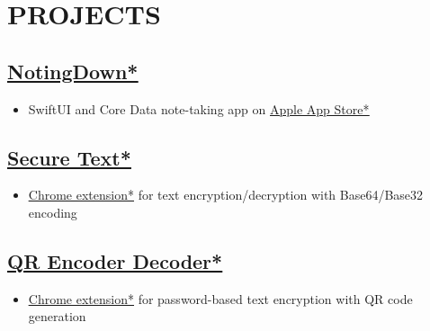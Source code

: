 \documentclass[11pt,a4paper]{moderncv}
\let\oldhref\href
\renewcommand{\href}[2]{\oldhref{#1}{\underline{#2}}}
\begin{document}
\begin{minipage}[t]{0.62\textwidth}
\section{PROJECTS}
\subsection{\href{https://github.com/sachin6174/NotingDown}{NotingDown*}}
\begin{itemize}
    \item SwiftUI and Core Data note-taking app on \href{https://apps.apple.com/us/app/notingdown/id123456789}{Apple App Store*}
\end{itemize}

\subsection{\href{https://github.com/sachin6174/SecureText}{Secure Text*}}
\begin{itemize}
    \item \href{https://chrome.google.com/webstore/detail/secure-text/id123456789}{Chrome extension*} for text encryption/decryption with Base64/Base32 encoding
\end{itemize}

\subsection{\href{https://github.com/sachin6174/QREncoderDecoder}{QR Encoder Decoder*}}
\begin{itemize}
    \item \href{https://chrome.google.com/webstore/detail/qr-encoder-decoder/id123456789}{Chrome extension*} for password-based text encryption with QR code generation
\end{itemize}

\end{minipage}
\hfill
\end{document}
